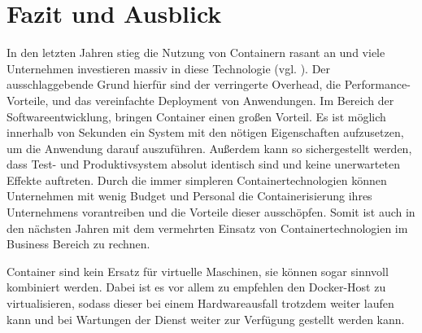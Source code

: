 \section{Fazit und Ausblick} 
\label{sec:Fazit}
In den letzten Jahren stieg die Nutzung von Containern rasant an und viele Unternehmen investieren massiv in diese Technologie (vgl. ). Der ausschlaggebende Grund hierfür sind der verringerte Overhead, die Performance-Vorteile, und das vereinfachte Deployment von Anwendungen.  Im Bereich der Softwareentwicklung, bringen Container einen großen Vorteil. Es ist möglich innerhalb von Sekunden ein System mit den nötigen Eigenschaften aufzusetzen, um die Anwendung darauf auszuführen. Außerdem kann so sichergestellt werden, dass Test- und Produktivsystem absolut identisch sind und keine unerwarteten Effekte auftreten. Durch die immer simpleren Containertechnologien können Unternehmen mit wenig Budget und Personal die Containerisierung ihres Unternehmens vorantreiben und die Vorteile dieser ausschöpfen. Somit ist auch in den nächsten Jahren mit dem vermehrten Einsatz von Containertechnologien im Business Bereich zu rechnen. 

Container sind kein Ersatz für virtuelle Maschinen, sie können sogar sinnvoll kombiniert werden. Dabei ist es vor allem zu empfehlen den Docker-Host zu virtualisieren, sodass dieser bei einem Hardwareausfall trotzdem weiter laufen kann und bei Wartungen der Dienst weiter zur Verfügung gestellt werden kann.

